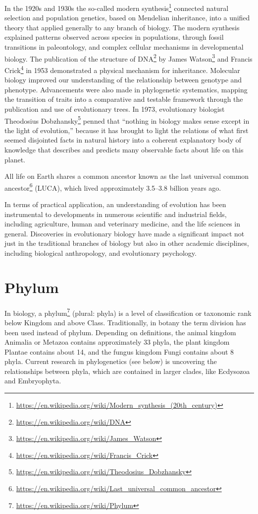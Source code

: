\documentclass[]{book}
\let\rmarkdownfootnote\footnote%
\def\footnote{\protect\rmarkdownfootnote}
\renewcommand{\href}[2]{#2\footnote{\url{#1}}}
\begin{document}
In the 1920s and 1930s the so-called \href{https://en.wikipedia.org/wiki/Modern_synthesis_(20th_century)}{modern synthesis} connected natural selection and population genetics, based on Mendelian inheritance, into a unified theory that applied generally to any branch of biology. The modern synthesis explained patterns observed across species in populations, through fossil transitions in paleontology, and complex cellular mechanisms in developmental biology. The publication of the structure of \href{https://en.wikipedia.org/wiki/DNA}{DNA} by \href{https://en.wikipedia.org/wiki/James_Watson}{James Watson} and \href{https://en.wikipedia.org/wiki/Francis_Crick}{Francis Crick} in 1953 demonstrated a physical mechanism for inheritance. Molecular biology improved our understanding of the relationship between genotype and phenotype. Advancements were also made in phylogenetic systematics, mapping the transition of traits into a comparative and testable framework through the publication and use of evolutionary trees. In 1973, evolutionary biologist \href{https://en.wikipedia.org/wiki/Theodosius_Dobzhansky}{Theodosius Dobzhansky} penned that ``nothing in biology makes sense except in the light of evolution,'' because it has brought to light the relations of what first seemed disjointed facts in natural history into a coherent explanatory body of knowledge that describes and predicts many observable facts about life on this planet.

All life on Earth shares a common ancestor known as the \href{https://en.wikipedia.org/wiki/Last_universal_common_ancestor}{last universal common ancestor} (LUCA), which lived approximately 3.5--3.8 billion years ago.

In terms of practical application, an understanding of evolution has been instrumental to developments in numerous scientific and industrial fields, including agriculture, human and veterinary medicine, and the life sciences in general. Discoveries in evolutionary biology have made a significant impact not just in the traditional branches of biology but also in other academic disciplines, including biological anthropology, and evolutionary psychology.

\hypertarget{phylum}{%
\section{Phylum}\label{phylum}}

In biology, a \href{https://en.wikipedia.org/wiki/Phylum}{phylum} (plural: phyla) is a level of classification or taxonomic rank below Kingdom and above Class. Traditionally, in botany the term division has been used instead of phylum. Depending on definitions, the animal kingdom Animalia or Metazoa contains approximately 33 phyla, the plant kingdom Plantae contains about 14, and the fungus kingdom Fungi contains about 8 phyla. Current research in phylogenetics (see below) is uncovering the relationships between phyla, which are contained in larger clades, like Ecdysozoa and Embryophyta.
\end{document}
